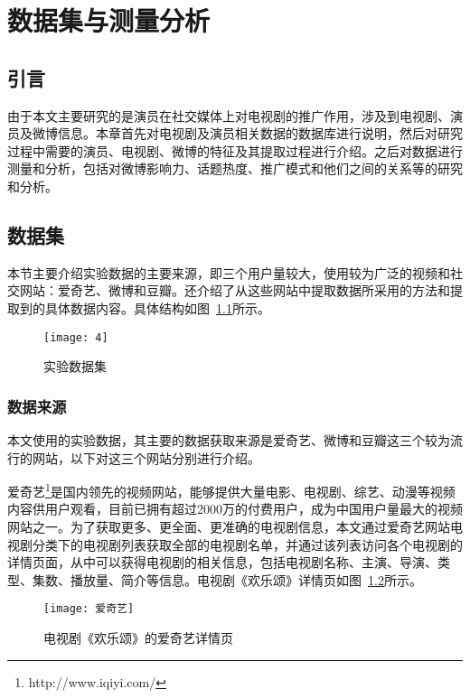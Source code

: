 \chapter{数据集与测量分析}
\label{cha:database and measurement}

\section{引言}
由于本文主要研究的是演员在社交媒体上对电视剧的推广作用，涉及到电视剧、演员及微博信息。本章首先对电视剧及演员相关数据的数据库进行说明，然后对研究过程中需要的演员、电视剧、微博的特征及其提取过程进行介绍。之后对数据进行测量和分析，包括对微博影响力、话题热度、推广模式和他们之间的关系等的研究和分析。

\section{数据集}

本节主要介绍实验数据的主要来源，即三个用户量较大，使用较为广泛的视频和社交网站：爱奇艺、微博和豆瓣。还介绍了从这些网站中提取数据所采用的方法和提取到的具体数据内容。具体结构如图~\ref{database}所示。

\begin{figure}[h] 
  \centering
  \texttt{[image: 4]}
  \caption{实验数据集}
  \label{database}
\end{figure}

\subsection{数据来源}

本文使用的实验数据，其主要的数据获取来源是爱奇艺、微博和豆瓣这三个较为流行的网站，以下对这三个网站分别进行介绍。

爱奇艺\footnote{http://www.iqiyi.com/}是国内领先的视频网站，能够提供大量电影、电视剧、综艺、动漫等视频内容供用户观看，目前已拥有超过2000万的付费用户，成为中国用户量最大的视频网站之一。为了获取更多、更全面、更准确的电视剧信息，本文通过爱奇艺网站电视剧分类下的电视剧列表获取全部的电视剧名单，并通过该列表访问各个电视剧的详情页面，从中可以获得电视剧的相关信息，包括电视剧名称、主演、导演、类型、集数、播放量、简介等信息。电视剧《欢乐颂》详情页如图~\ref{爱奇艺}所示。

\begin{figure}[h] 
  \centering
  \texttt{[image: 爱奇艺]}
  \caption{电视剧《欢乐颂》的爱奇艺详情页}
  \label{爱奇艺}
\end{figure}

